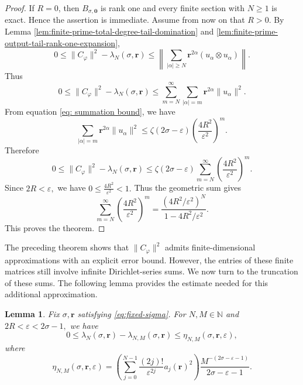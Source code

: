 \documentclass[12pt, reqno]{amsart}
\numberwithin{equation}{section}
\newtheorem{lemma}[theorem]{Lemma}
\begin{document}
\begin{proof}


If \(R=0\), then \(B_{\sigma,\boldsymbol0}\) is rank one and every
finite section with \(N\geq1\) is exact. Hence the assertion is immediate.
Assume from now on that \(R>0\).
By Lemma \ref{lem:finite-prime-total-degree-tail-domination} and \ref{lem:finite-prime-output-tail-rank-one-expansion},
\[
0\leq
\|C_{\varphi}\|^{2}
-
\lambda_N(\sigma,\boldsymbol{r})
\leq
\left\|
\sum_{|\alpha|\geq N}
\boldsymbol{r}^{2\alpha}(u_{\alpha}\otimes u_{\alpha})
\right\|.
\]
Thus
\[
0\leq
\|C_{\varphi}\|^{2}
-
\lambda_N(\sigma,\boldsymbol{r})
\leq
\sum_{m=N}^{\infty}
\sum_{|\alpha|=m}
\boldsymbol{r}^{2\alpha}\|u_{\alpha}\|^{2}.
\]
From equation \eqref{eq: summation bound}, we have
\[
\sum_{|\alpha|=m}
\boldsymbol{r}^{2\alpha}\|u_{\alpha}\|^{2}
\leq
\zeta(2\sigma-\varepsilon)
\left(\frac{4R^2}{\varepsilon^2}\right)^m.
\]
Therefore
\[
0\leq
\|C_{\varphi}\|^{2}
-
\lambda_N(\sigma,\boldsymbol{r})
\leq
\zeta(2\sigma-\varepsilon)
\sum_{m=N}^{\infty}
\left(\frac{4R^2}{\varepsilon^2}\right)^m.
\]
Since $2R<\varepsilon,$ we have
$0\leq \frac{4R^2}{\varepsilon^2}<1.$ Thus the geometric sum gives
\[
\sum_{m=N}^{\infty}
\left(\frac{4R^2}{\varepsilon^2}\right)^m
=
\frac{(4R^{2}/\varepsilon^{2})^{N}}{1-4R^{2}/\varepsilon^{2}}.
\]
This proves the theorem.
\end{proof}
The preceding theorem shows that $\|C_\varphi\|^2$ admits
finite-dimensional approximations with an explicit error bound. However, the entries of these finite matrices still
involve infinite Dirichlet-series sums. We now turn to the truncation of
these sums. The following lemma provides the estimate needed for this
additional approximation.
\begin{lemma}
\label{lem:finite-prime-universal}
Fix $\sigma,\boldsymbol{r}$ satisfying \eqref{eq:fixed-sigma}.
For $N,M\in\mathbb{N}$ and
$2R<\varepsilon<2\sigma-1,$ we have
\[
0\leq
\lambda_N(\sigma,\boldsymbol{r})
-
\lambda_{N,M}(\sigma,\boldsymbol{r})
\leq
\eta_{N,M}(\sigma,\boldsymbol{r},\varepsilon),
\]
where
\[
\eta_{N,M}(\sigma,\boldsymbol{r},\varepsilon)
=
\left(
\sum_{j=0}^{N-1}
\frac{(2j)!}{\varepsilon^{2j}}a_j(\boldsymbol{r})^{2}
\right)
\frac{M^{-(2\sigma-\varepsilon-1)}}{2\sigma-\varepsilon-1}.
\]
\end{lemma}
\end{document}
